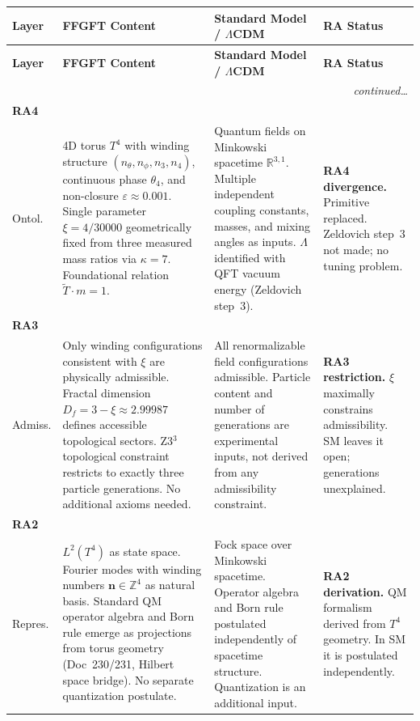 \renewcommand{\arraystretch}{1.4}
{\small
\begin{longtable}{p{2.0cm}p{4.4cm}p{4.4cm}p{2.55cm}}

\toprule
\textbf{Layer} & \textbf{FFGFT Content} & \textbf{Standard Model / \(\Lambda\)CDM} & \textbf{RA Status} \\
\midrule
\endfirsthead
\toprule
\textbf{Layer} & \textbf{FFGFT Content} & \textbf{Standard Model / \(\Lambda\)CDM} & \textbf{RA Status} \\
\midrule
\endhead
\midrule\multicolumn{4}{r}{\footnotesize\itshape continued\ldots}\\\endfoot
\bottomrule\endlastfoot
\sloppy\raggedright

\textbf{RA4}\\Ontol. &
4D torus $T^4$ with winding structure $(n_\theta, n_\phi, n_3, n_4)$, continuous phase $\theta_4$, and non-closure $\varepsilon \approx 0.001$. Single parameter $\xi = 4/30000$ geometrically fixed from three measured mass ratios via $\kappa = 7$. Foundational relation $\tilde{T}\cdot m = 1$. &
Quantum fields on Minkowski spacetime $\mathbb{R}^{3,1}$. Multiple independent coupling constants, masses, and mixing angles as inputs. $\Lambda$ identified with QFT vacuum energy (Zeldovich step~3). &
\textbf{RA4 divergence.} Primitive replaced. Zeldovich step~3 not made; no tuning problem. \\

\midrule

\textbf{RA3}\\Admiss. &
Only winding configurations consistent with $\xi$ are physically admissible. Fractal dimension $D_f = 3-\xi \approx 2.99987$ defines accessible topological sectors. Z3$^3$ topological constraint restricts to exactly three particle generations. No additional axioms needed. &
All renormalizable field configurations admissible. Particle content and number of generations are experimental inputs, not derived from any admissibility constraint. &
\textbf{RA3 restriction.} $\xi$ maximally constrains admissibility. SM leaves it open; generations unexplained. \\

\midrule

\textbf{RA2}\\Repres. &
$L^2(T^4)$ as state space. Fourier modes with winding numbers \mbox{$\mathbf{n}\in\mathbb{Z}^4$} as natural basis. Standard QM operator algebra and Born rule emerge as projections from torus geometry (Doc~230/231,
  Hilbert space bridge). No separate quantization postulate. &
Fock space over Minkowski spacetime. Operator algebra and Born rule postulated independently of spacetime structure. Quantization is an additional input. &
\textbf{RA2 derivation.} QM formalism derived from $T^4$ geometry. In SM it is postulated independently. \\


\end{longtable}}
